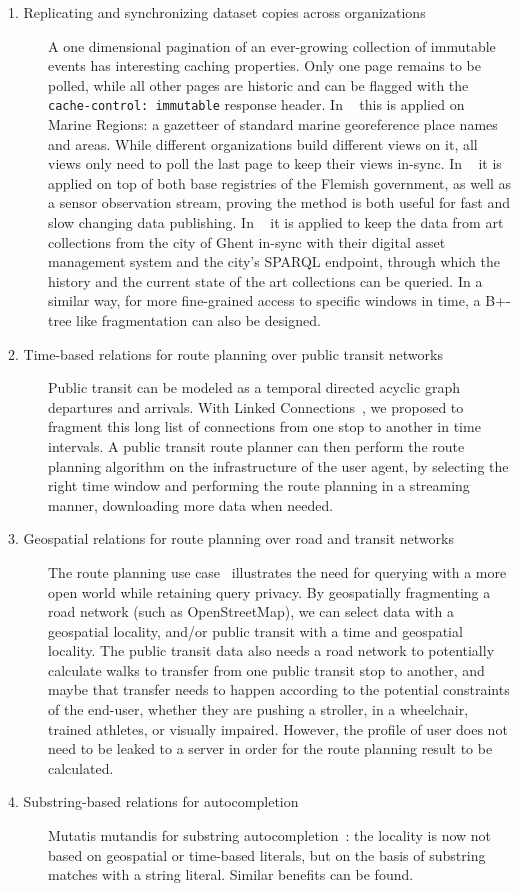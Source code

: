 \documentclass[
]{ceurart}
\begin{document}
\begin{description}
\item[1. Replicating and synchronizing dataset copies across organizations]
A one dimensional pagination of an ever-growing collection of immutable events has interesting caching properties.
Only one page remains to be polled, while all other pages are historic and can be flagged with the \texttt{cache-control: immutable} response header.
In ~\cite{lonneville2021publishing} this is applied on Marine Regions: a gazetteer of standard marine georeference place names and areas. While different organizations build different views on it, all views only need to poll the last page to keep their views in-sync.
In ~\cite{ldes} it is applied on top of both base registries of the Flemish government, as well as a sensor observation stream, proving the method is both useful for fast and slow changing data publishing.
In ~\cite{van2022publishing} it is applied to keep the data from art collections from the city of Ghent in-sync with their digital asset management system and the city’s SPARQL endpoint, through which the history and the current state of the art collections can be queried.
In a similar way, for more fine-grained access to specific windows in time, a B+-tree like fragmentation can also be designed.
 \item[2. Time-based relations for route planning over public transit networks]
Public transit can be modeled as a temporal directed acyclic graph departures and arrivals. With Linked Connections~\cite{rojas2022publishing}, we proposed to fragment this long list of connections from one stop to another in time intervals. A public transit route planner can then perform the route planning algorithm on the infrastructure of the user agent, by selecting the right time window and performing the route planning in a streaming manner, downloading more data when needed.
 \item[3. Geospatial relations for route planning over road and transit networks]
The route planning use case~\cite{delva2019client} illustrates the need for querying with a more open world while retaining query privacy.
By geospatially fragmenting a road network (such as OpenStreetMap), we can select data with a geospatial locality, and/or public transit with a time and geospatial locality.
The public transit data also needs a road network to potentially calculate walks to transfer from one public transit stop to another, and maybe that transfer needs to happen according to the potential constraints of the end-user, whether they are pushing a stroller, in a wheelchair, trained athletes, or visually impaired. However, the profile of user does not need to be leaked to a server in order for the route planning result to be calculated.
 \item[4. Substring-based relations for autocompletion]
Mutatis mutandis for substring autocompletion~\cite{dedecker2021file}: the locality is now not based on geospatial or time-based literals, but on the basis of substring matches with a string literal. Similar benefits can be found.
\end{description}
\end{document}
